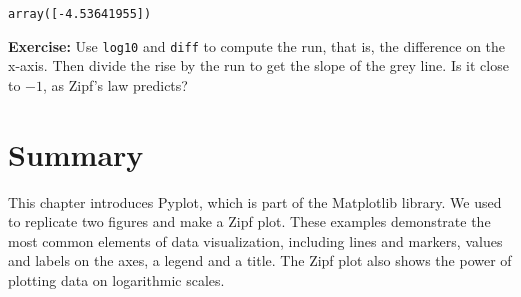 \begin{lstlisting}[style=output]
array([-4.53641955])
\end{lstlisting}

\textbf{Exercise:} Use \passthrough{\lstinline!log10!} and
\passthrough{\lstinline!diff!} to compute the run, that is, the
difference on the x-axis. Then divide the rise by the run to get the
slope of the grey line. Is it close to \(-1\), as Zipf's law predicts?

\section{Summary}\label{summary}

This chapter introduces Pyplot, which is part of the Matplotlib library.
We used to replicate two figures and make a Zipf plot. These examples
demonstrate the most common elements of data visualization, including
lines and markers, values and labels on the axes, a legend and a title.
The Zipf plot also shows the power of plotting data on logarithmic
scales.

